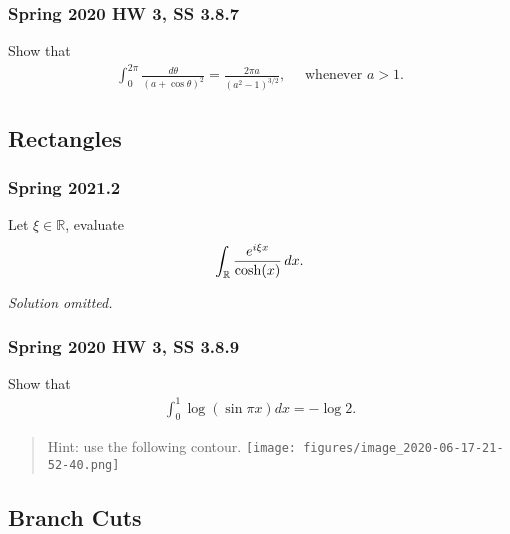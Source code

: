 \hypertarget{spring-2020-hw-3-ss-3.8.7}{%
\subsubsection{Spring 2020 HW 3, SS
3.8.7}\label{spring-2020-hw-3-ss-3.8.7}}

Show that
\begin{align*}
\int_{0}^{2 \pi} \frac{d \theta}{(a+\cos \theta)^{2}}=\frac{2 \pi a}{\left(a^{2}-1\right)^{3 / 2}}, \quad \text { whenever } a>1
.\end{align*}

\hypertarget{rectangles}{%
\subsection{Rectangles}\label{rectangles}}

\hypertarget{spring-2021.2}{%
\subsubsection{Spring 2021.2}\label{spring-2021.2}}

\begin{problem}[?]

Let \(\xi\in {\mathbb{R}}\), evaluate
\begin{align*}
\int_{\mathbb{R}}{e^{i\xi x} \over \cosh(x)} \,dx
.\end{align*}

\end{problem}

\emph{Solution omitted.}

\hypertarget{spring-2020-hw-3-ss-3.8.9}{%
\subsubsection{Spring 2020 HW 3, SS
3.8.9}\label{spring-2020-hw-3-ss-3.8.9}}

Show that
\begin{align*}
\int_{0}^{1} \log (\sin \pi x) d x=-\log 2
.\end{align*}

\begin{quote}
Hint: use the following contour.
\texttt{[image: figures/image\_2020-06-17-21-52-40.png]}
\end{quote}

\hypertarget{branch-cuts}{%
\subsection{Branch Cuts}\label{branch-cuts}}


